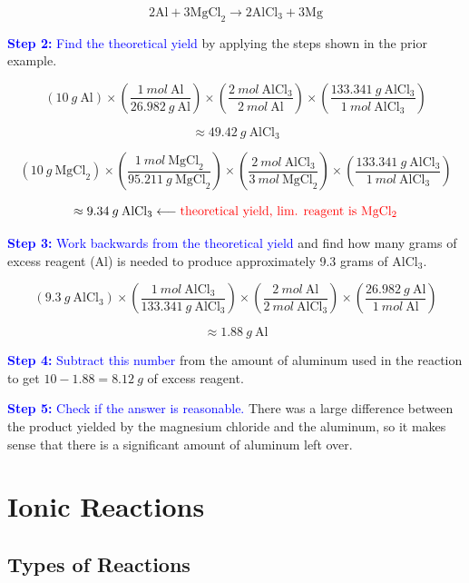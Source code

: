 \documentclass[a4paper, 12pt]{article}
\begin{document}
$$\text{2Al} + \text{3MgCl}_2 \longrightarrow \text{2AlCl}_3 + \text{3Mg}$$

\textcolor{blue}{\textbf{Step 2:} Find the theoretical yield} by applying the steps shown in the prior example.

$$(10 \: g \: \text{Al}) \times \left(\frac{1 \: mol \: \text{Al}}{26.982 \: g \: \text{Al}}\right) \times \left(\frac{2 \: mol \: \text{AlCl}_3}{2 \: mol \: \text{Al}}\right) \times \left(\frac{133.341 \: g \: \text{AlCl}_3}{1 \: mol \: \text{AlCl}_3}\right)$$

$$ \approx 49.42 \: g \: \text{AlCl}_3$$

$$(10 \: g \: \text{MgCl}_2) \times \left(\frac{1 \: mol \: \text{MgCl}_2}{95.211 \: g \: \text{MgCl}_2}\right) \times \left(\frac{2 \: mol \: \text{AlCl}_3}{3 \: mol \: \text{MgCl}_2}\right) \times \left(\frac{133.341 \: g \: \text{AlCl}_3}{1 \: mol \: \text{AlCl}_3}\right)$$

$$ \approx 9.34 \: g \: \text{AlCl}_3 \longleftarrow \text{\textcolor{red}{theoretical yield, lim. reagent is MgCl$_2$}}$$

\textcolor{blue}{\textbf{Step 3:} Work backwards from the theoretical yield} and find how many grams of excess reagent (Al) is needed to produce approximately 9.3 grams of AlCl$_3$.

$$(9.3 \: g \: \text{AlCl}_3) \times \left(\frac{1 \: mol \: \text{AlCl}_3}{133.341 \: g \: \text{AlCl}_3}\right) \times \left(\frac{2 \: mol \: \text{Al}}{2 \: mol \: \text{AlCl}_3}\right) \times \left(\frac{26.982 \: g \: \text{Al}}{1 \: mol \: \text{Al}}\right)$$

$$\approx 1.88 \: g \: \text{Al}$$

\textcolor{blue}{\textbf{Step 4:} Subtract this number} from the amount of aluminum used in the reaction to get $10 - 1.88 = \boxed{8.12 \: g}$ of excess reagent.

\textcolor{blue}{\textbf{Step 5:} Check if the answer is reasonable.} There was a large difference between the product yielded by the magnesium chloride and the aluminum, so it makes sense that there is a significant amount of aluminum left over.

\section{Ionic Reactions}

\subsection{Types of Reactions} \label{types of reactions}
\end{document}
